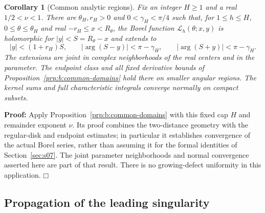 \documentclass[a4paper,10pt]{article}
\numberwithin{equation}{section}
\theoremstyle{paperplain}
\newtheorem{crl}[thm]{Corollary}
\theoremstyle{paperremark}
\theoremstyle{paperplain}
\newenvironment{prf}{\noindent \textbf{Proof: }}{\hfill $\mdlgwhtsquare$\par\addvspace{0.5\baselineskip}}
\begin{document}
\begin{crl}[Common analytic regions]\label{crl:s08:domains}
Fix an integer $H\geq1$ and a real $1/2<\nu<1$. There are
$\theta_H,r_H>0$ and $0<\gamma_H<\pi/4$ such that, for
$1\leq h\leq H$, $0\leq\theta\leq\theta_H$ and real
$-r_H\leq x<R_\theta$, the Borel function
$\mathcal L_h(\theta;x,y)$ is holomorphic for $|y|<S=R_\theta-x$
and extends to
\begin{equation}\label{eq:s08:dented-domains}
 |y|<(1+r_H)S,\qquad
 |\arg(S-y)|<\pi-\gamma_H,\qquad
 |\arg(S+y)|<\pi-\gamma_H.
\end{equation}
The extensions are joint in complex neighborhoods of the real
centers and in the parameter. The endpoint class and all fixed
derivative bounds of Proposition~\ref{prp:b:common-domains} hold
there on smaller angular regions. The kernel sums and full
characteristic integrals converge normally on compact subsets.
\end{crl}
\begin{prf}
Apply Proposition~\ref{prp:b:common-domains} with this fixed cap
$H$ and remainder exponent $\nu$. Its proof combines the
two-distance geometry with the regular-disk and endpoint estimates;
in particular it establishes convergence of the actual Borel
series, rather than assuming it for the formal identities of
Section~\ref{sec:s07}. The joint parameter neighborhoods and normal
convergence asserted here are part of that result. There is no
growing-defect uniformity in this application.
\end{prf}

\subsection{Propagation of the leading singularity}
\label{subsec:s08:02}
\end{document}
